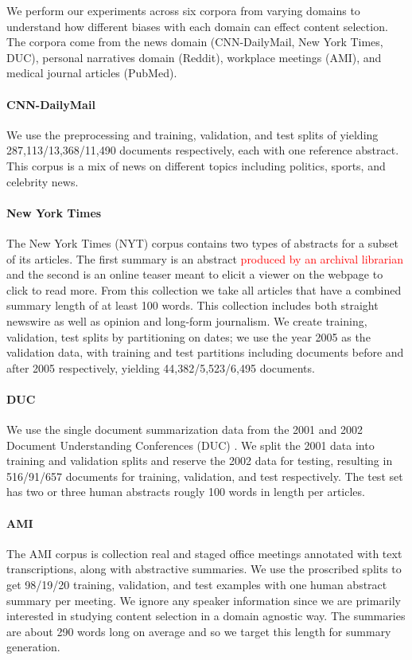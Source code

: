 We perform our experiments across six corpora from varying domains to 
understand how different biases with each domain can effect content 
selection. The corpora come from the news domain
(CNN-DailyMail, New York Times, DUC), personal narratives domain (Reddit),
workplace meetings (AMI), and medical journal articles (PubMed).

\paragraph{CNN-DailyMail} We use the preprocessing and training, validation, 
and test splits
of \cite{see2017get} yielding 287,113/13,368/11,490 documents respectively, each with one reference
abstract. This corpus is a mix of news on different topics including politics,
sports, and celebrity news.

\paragraph{New York Times}{The New York Times (NYT) corpus \cite{sandhaus2008new} contains
 two types of abstracts for a subset of its articles. The first summary is
an abstract \textcolor{red}{produced by an archival librarian} and the 
second is an online teaser meant to elicit a viewer on the webpage to
click to read more. From this collection we take all articles that have 
a combined summary length of at least 100 words. This collection
includes both straight newswire as well as opinion and long-form journalism.
We create training, validation, test splits by partitioning on dates;
we use the year 2005 as the validation data, with training and test partitions
including documents before and after 2005 respectively,
yielding 44,382/5,523/6,495 documents.}

\paragraph{DUC}{We use the single document summarization data from the 2001
and 2002
Document Understanding Conferences (DUC) \cite{over2002introduction}. We split the 2001 data into training
and validation splits and reserve the 2002 data for testing, resulting in
516/91/657 documents for training, validation, and test respectively. 
The test set has two or three human abstracts rougly 100 words in length per 
articles.}

\paragraph{AMI}{The AMI corpus \cite{carletta2005ami} 
is collection real and staged office meetings
annotated with text transcriptions, along with abstractive
summaries. We use the proscribed splits to get 98/19/20 training, validation,
and test examples with one human abstract summary per meeting. 
We ignore any speaker information since we are primarily
interested in studying content selection in a domain agnostic way.
The summaries are about 290 words long on average and so we target this length
for summary generation.
}

